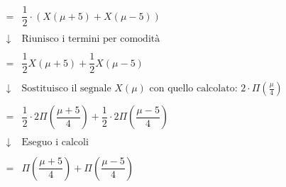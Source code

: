 \documentclass[a4paper]{article}
\begin{document}
\begin{equation*}
\begin{array}{lll}
			\\
			& = & \dfrac{1}{2} \cdot \left(X\left(\mu+5\right) + X\left(\mu-5\right)\right) \\
			\\
			& \downarrow & \text{Riunisco i termini per comodità} \\
			\\
			& = & \dfrac{1}{2}X\left(\mu+5\right) + \dfrac{1}{2}X\left(\mu-5\right) \\
			\\
			& \downarrow & \text{Sostituisco il segnale } X\left(\mu\right) \text{ con quello calcolato: } 2\cdot\Pi\left(\frac{\mu}{4}\right) \\
			\\
			& = & \dfrac{1}{2} \cdot 2 \Pi\left(\dfrac{\mu + 5}{4}\right) + \dfrac{1}{2} \cdot 2 \Pi\left(\dfrac{\mu - 5}{4}\right) \\
			\\
			& \downarrow & \text{Eseguo i calcoli} \\
			\\
			& = & \Pi\left(\dfrac{\mu + 5}{4}\right) + \Pi\left(\dfrac{\mu - 5}{4}\right)
		\end{array}
	\end{equation*}\newpage
\end{document}
